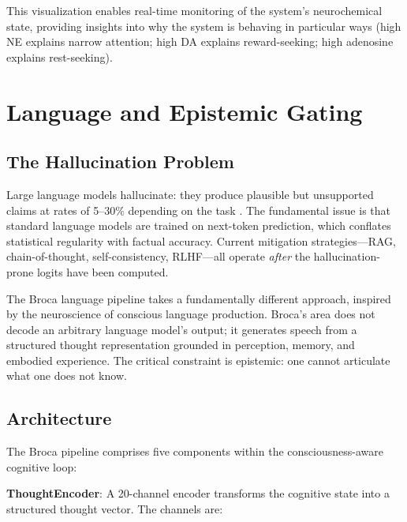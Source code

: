 \documentclass[12pt]{book}
\begin{document}
This visualization enables real-time monitoring of the system's neurochemical state, providing insights into why the system is behaving in particular ways (high NE explains narrow attention; high DA explains reward-seeking; high adenosine explains rest-seeking).


\chapter{Language and Epistemic Gating}
\label{ch:broca}

\section{The Hallucination Problem}

Large language models hallucinate: they produce plausible but unsupported claims at rates of 5--30\% depending on the task \citep{ji2023survey}. The fundamental issue is that standard language models are trained on next-token prediction, which conflates statistical regularity with factual accuracy. Current mitigation strategies---RAG, chain-of-thought, self-consistency, RLHF---all operate \textit{after} the hallucination-prone logits have been computed.

The Broca language pipeline takes a fundamentally different approach, inspired by the neuroscience of conscious language production. Broca's area does not decode an arbitrary language model's output; it generates speech from a structured thought representation grounded in perception, memory, and embodied experience. The critical constraint is epistemic: one cannot articulate what one does not know.

\section{Architecture}

The Broca pipeline comprises five components within the consciousness-aware cognitive loop:

\textbf{ThoughtEncoder}: A 20-channel encoder transforms the cognitive state into a structured thought vector. The channels are:
\end{document}
